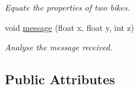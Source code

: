 \begin{DoxyCompactItemize}
\begin{DoxyCompactList}\small\item\em Equate the properties of two bikes. \end{DoxyCompactList}\item 
\hypertarget{class_bike_a2e01e6f80129da96c1c2629e3573f68e}{void \hyperlink{class_bike_a2e01e6f80129da96c1c2629e3573f68e}{message} (float x, float y, int z)}\label{class_bike_a2e01e6f80129da96c1c2629e3573f68e}

\begin{DoxyCompactList}\small\item\em Analyse the message received. \end{DoxyCompactList}\end{DoxyCompactItemize}
\subsection*{Public Attributes}
